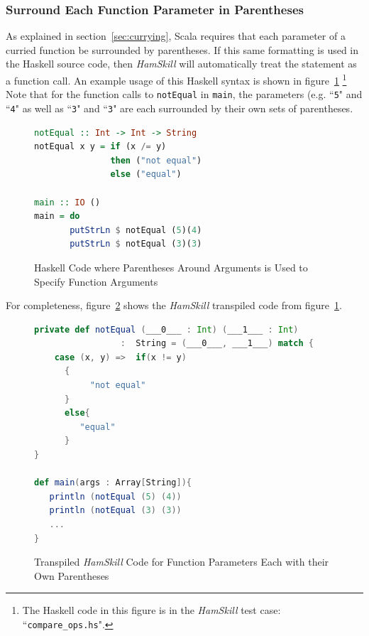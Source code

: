 \documentclass{report}
\begin{document}
\subsubsection{Surround Each Function Parameter in Parentheses}

As explained in section~\ref{sec:currying}, Scala requires that each parameter of a curried function be surrounded by parentheses. If this same formatting is used in the Haskell source code, then \textit{HamSkill} will automatically treat the statement as a function call.  An example usage of this Haskell syntax is shown in figure~\ref{fig:haskellFunctionParenthesesFuncArgs} \footnote{The Haskell code in this figure is in the \textit{HamSkill} test case: ``\texttt{compare\_ops.hs}".}  Note that for the function calls to \texttt{notEqual} in \texttt{main}, the parameters (e.g. ``\texttt{5}" and ``\texttt{4}" as well as ``\texttt{3}" and ``\texttt{3}" are each surrounded by their own sets of parentheses.

\begin{figure}[H]
\begin{mdframed}
\begin{lstlisting}[language=Haskell]
notEqual :: Int -> Int -> String
notEqual x y = if (x /= y)
               then ("not equal")
               else ("equal")
               
main :: IO ()
main = do 
       putStrLn $ notEqual (5)(4)
       putStrLn $ notEqual (3)(3)
\end{lstlisting}
\end{mdframed}
\caption{Haskell Code where Parentheses Around Arguments is Used to Specify Function Arguments}\label{fig:haskellFunctionParenthesesFuncArgs}
\end{figure}

For completeness, figure~\ref{fig:scalaFunctionParenthesesFuncArgs} shows the \textit{HamSkill} transpiled code from figure~\ref{fig:haskellFunctionParenthesesFuncArgs}.

\begin{figure}[H]
\begin{mdframed}
\begin{lstlisting}[language=Scala, showstringspaces=false]
private def notEqual (___0___ : Int) (___1___ : Int) 
                 :  String = (___0___, ___1___) match {
    case (x, y) =>  if(x != y)
      {
           "not equal"
      }
      else{
         "equal"
      }
} 
  
def main(args : Array[String]){
   println (notEqual (5) (4))
   println (notEqual (3) (3))
   ...
}
\end{lstlisting}
\end{mdframed}
\caption{Transpiled \textit{HamSkill} Code for Function Parameters Each with their Own Parentheses}\label{fig:scalaFunctionParenthesesFuncArgs}
\end{figure}
\end{document}
